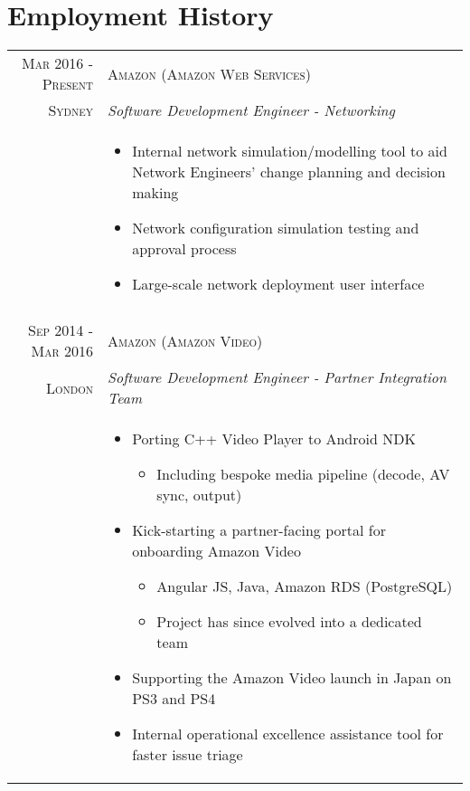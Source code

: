 \section*{Employment History}

\begin{tabular}{r|p{11cm}}

\textsc{Mar 2016 - Present} & \textsc{Amazon (Amazon Web Services)}\\
\textsc{Sydney} & \emph{Software Development Engineer - Networking}\\
& \begin{footnotesize}
\begin{itemize}
	\vspace*{-\baselineskip}
	\item Internal network simulation/modelling tool to aid Network Engineers' change planning and decision making
	\item Network configuration simulation testing and approval process
	\item Large-scale network deployment user interface
	\vspace*{-\baselineskip}
\end{itemize}
\end{footnotesize}\\

\multicolumn{2}{c}{} \\

\textsc{Sep 2014 - Mar 2016} & \textsc{Amazon (Amazon Video)}\\
\textsc{London} & \emph{Software Development Engineer - Partner Integration Team}\\
& \begin{footnotesize}
\begin{itemize}
	\vspace*{-\baselineskip}
	\item Porting C++ Video Player to Android NDK
		\begin{itemize}
		\item Including bespoke media pipeline (decode, AV sync, output)
		\end{itemize}
	\item Kick-starting a partner-facing portal for onboarding Amazon Video
		\begin{itemize}
		\item Angular JS, Java, Amazon RDS (PostgreSQL)
		\item Project has since evolved into a dedicated team
		\end{itemize}
	\item Supporting the Amazon Video launch in Japan on PS3 and PS4
	\item Internal operational excellence assistance tool for faster issue triage
	\vspace*{-\baselineskip}
\end{itemize}
\end{footnotesize}\\


\end{tabular}
